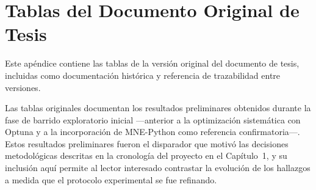 \chapter{Tablas del Documento Original de Tesis}
\label{ap:original_adaptado}

Este apéndice contiene las tablas de la versión original del documento de tesis, incluidas como documentación histórica y referencia de trazabilidad entre versiones.

Las tablas originales documentan los resultados preliminares obtenidos durante la fase de barrido exploratorio inicial —anterior a la optimización sistemática con Optuna y a la incorporación de MNE-Python como referencia confirmatoria—. Estos resultados preliminares fueron el disparador que motivó las decisiones metodológicas descritas en la cronología del proyecto en el Capítulo~1, y su inclusión aquí permite al lector interesado contrastar la evolución de los hallazgos a medida que el protocolo experimental se fue refinando.